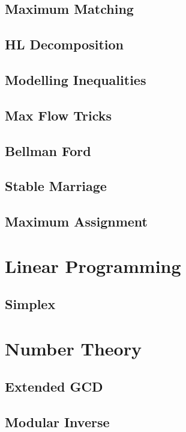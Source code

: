 		\subsection{Maximum Matching}
			
		\subsection{HL Decomposition}
			
		\subsection{Modelling Inequalities}
			
		\subsection{Max Flow Tricks}
			
		\subsection{Bellman Ford}
			
		\subsection{Stable Marriage}
			
		\subsection{Maximum Assignment}
			
	\section{Linear Programming}
		\subsection{Simplex}
			
	\section{Number Theory}
		\subsection{Extended GCD}
			
		\subsection{Modular Inverse}
			
